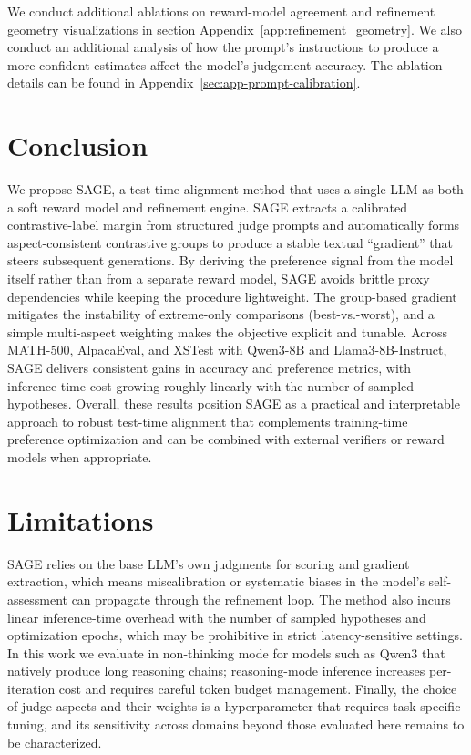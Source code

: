 \documentclass[11pt]{article}
\theoremstyle{plain}
\theoremstyle{definition}
\theoremstyle{remark}
\newcommand{\method}{SAGE}
\begin{document}
\noindent We conduct additional ablations on reward-model agreement and refinement geometry visualizations in section Appendix~\ref{app:refinement_geometry}. We also conduct an additional analysis of how the prompt's instructions to produce a more confident estimates affect the model's judgement accuracy. The ablation details can be found in Appendix~\ref{sec:app-prompt-calibration}.

\section{Conclusion}
\noindent We propose \method{}, a test-time alignment method that uses a single LLM as both a soft reward model and refinement engine. \method{} extracts a calibrated contrastive-label margin from structured judge prompts and automatically forms aspect-consistent 
contrastive
groups to produce a stable textual ``gradient'' that steers subsequent generations. By deriving the preference signal from the model itself rather than from a separate reward model, \method{} avoids brittle proxy dependencies while keeping the procedure lightweight. The group-based gradient mitigates the instability of extreme-only comparisons (best-vs.-worst), and a simple multi-aspect weighting makes the objective explicit and tunable. Across MATH-500, AlpacaEval, and XSTest with Qwen3-8B and Llama3-8B-Instruct, \method{} delivers consistent gains in accuracy and preference metrics, with inference-time cost growing roughly linearly with the number of sampled hypotheses. Overall, these results position \method{} as a practical and interpretable approach to robust test-time alignment that complements training-time preference optimization and can be combined with external verifiers or reward models when appropriate.

\section*{Limitations}
\noindent \method{} relies on the base LLM's own judgments for scoring and gradient extraction, which means miscalibration or systematic biases in the model's self-assessment can propagate through the refinement loop. The method also incurs linear inference-time overhead with the number of sampled hypotheses and optimization epochs, which may be prohibitive in strict latency-sensitive settings. In this work we evaluate in non-thinking mode for models such as Qwen3 that natively produce long reasoning chains; reasoning-mode inference increases per-iteration cost and requires careful token budget management. Finally, the choice of judge aspects and their weights is a hyperparameter that requires task-specific tuning, and its sensitivity across domains beyond those evaluated here remains to be characterized.
\end{document}
